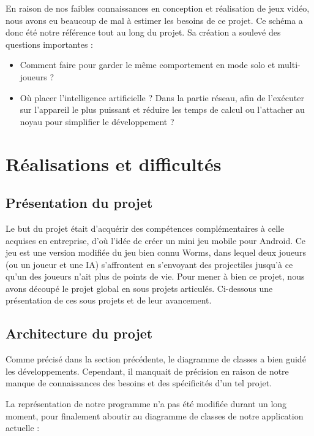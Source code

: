 \documentclass{report}
\begin{document}
En raison de nos faibles connaissances en conception et réalisation de
jeux vidéo, nous avons eu beaucoup de mal à estimer les besoins de ce
projet. Ce schéma a donc été notre référence tout au long du projet. Sa
création a soulevé des questions importantes :

\begin{itemize}
\item Comment faire pour garder le même comportement en mode solo et
multi-joueurs ?
\item Où placer l’intelligence artificielle ? Dans la partie réseau,
afin de l’exécuter sur l’appareil le plus puissant et réduire les temps
de calcul ou l’attacher au noyau pour simplifier le développement ?
\end{itemize}

\newpage

\section{Réalisations et difficultés}
\bigskip


\subsection{Présentation du projet}
\bigskip


Le but du projet était d'acquérir des compétences complémentaires à
celle acquises en entreprise, d’où l’idée de créer un mini jeu mobile
pour Android. Ce jeu est une version modifiée du jeu bien connu Worms,
dans lequel deux joueurs (ou un joueur et une IA) s’affrontent en
s’envoyant des projectiles jusqu’à ce qu’un des joueurs n’ait plus de
points de vie.
Pour mener à bien ce projet, nous avons découpé le projet global en
sous projets articulés. Ci-dessous une présentation de ces sous projets
et de leur avancement.

\subsection{Architecture du projet}
\bigskip


Comme précisé dans la section précédente, le diagramme de classes a bien
guidé les développements. Cependant, il manquait de précision en raison
de notre manque de connaissances des besoins et des spécificités d’un
tel projet.

La représentation de notre programme n’a pas été modifiée durant un
long moment, pour finalement aboutir au diagramme de classes de notre
application actuelle :
\end{document}
